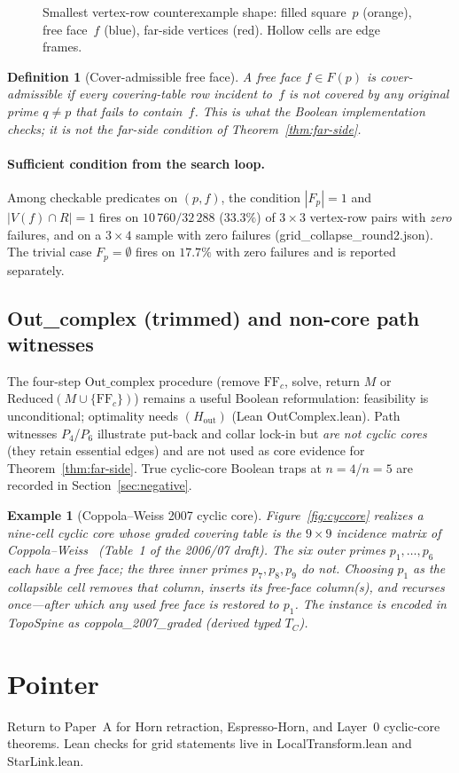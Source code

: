\documentclass[11pt]{article}
\newtheorem{definition}[theorem]{Definition}
\newtheorem{example}[theorem]{Example}
\begin{document}
\begin{figure}[ht]
\centering

\caption{Smallest vertex-row counterexample shape: filled square~$p$ (orange),
free face~$f$ (blue), far-side vertices (red).  Hollow cells are edge frames.}
\label{fig:grid-cex}
\end{figure}

\begin{definition}[Cover-admissible free face]
\label{def:admissible}
A free face $f\in F(p)$ is \emph{cover-admissible} if every covering-table row
incident to~$f$ is not covered by any original prime $q\neq p$ that fails to
contain~$f$.  This is what the Boolean implementation checks; it is
\emph{not} the far-side condition of Theorem~\ref{thm:far-side}.
\end{definition}

\paragraph{Sufficient condition from the search loop.}
Among checkable predicates on $(p,f)$, the condition
$|F_p|=1$ and $|V(f)\cap R|=1$ fires on $10\,760/32\,288$ ($33.3\%$) of $3\times 3$
vertex-row pairs with \emph{zero} failures, and on a $3\times 4$ sample with zero
failures (\textsf{grid\_collapse\_round2.json}).  The trivial case $F_p=\emptyset$
fires on $17.7\%$ with zero failures and is reported separately.

\subsection{Out\_complex (trimmed) and non-core path witnesses}
\label{sec:outcomplex}

The four-step $\mathrm{Out\_complex}$ procedure (remove $\mathrm{FF}_c$, solve,
return $M$ or $\mathrm{Reduced}(M\cup\{\mathrm{FF}_c\})$) remains a useful Boolean
reformulation: feasibility is unconditional; optimality needs $(H_{\mathrm{out}})$
(Lean \textsf{OutComplex.lean}).  Path witnesses $P_4$/$P_6$ illustrate put-back
and collar lock-in but \emph{are not cyclic cores} (they retain essential edges)
and are not used as core evidence for Theorem~\ref{thm:far-side}.  True cyclic-core
Boolean traps at $n=4$/$n=5$ are recorded in Section~\ref{sec:negative}.

\begin{example}[Coppola--Weiss 2007 cyclic core]
\label{ex:cyccore}
Figure~\ref{fig:cyccore} realizes a nine-cell cyclic core whose graded
covering table is the $9\times 9$ incidence matrix of
Coppola--Weiss~\cite{coppola2007} (Table~1 of the 2006/07 draft).  The six
outer primes $p_1,\ldots,p_6$ each have a free face; the three inner primes
$p_7,p_8,p_9$ do not.  Choosing $p_1$ as the collapsible cell removes that
column, inserts its free-face column(s), and recurses once---after which any
used free face is restored to $p_1$.  The instance is encoded in
\textsf{TopoSpine} as \textsf{coppola\_2007\_graded} (derived typed $T_C$).
\end{example}



\section*{Pointer}
Return to Paper~A for Horn retraction, Espresso-Horn, and Layer~0 cyclic-core
theorems.  Lean checks for grid statements live in \textsf{LocalTransform.lean}
and \textsf{StarLink.lean}.
\end{document}
